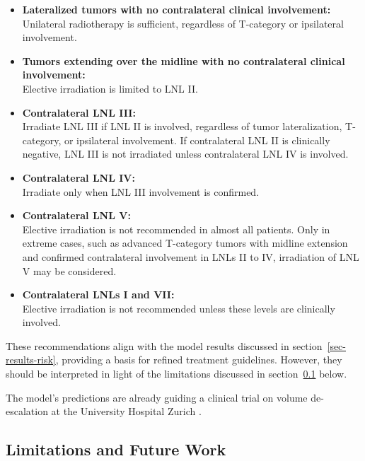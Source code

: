 \documentclass[
  sn-mathphys-num,
]{sn-jnl}
\providecommand{\tightlist}{%
  \setlength{\itemsep}{0pt}\setlength{\parskip}{0pt}}\usepackage{longtable,booktabs,array}
\begin{document}
\begin{itemize}
\tightlist
\item
  \textbf{Lateralized tumors with no contralateral clinical
  involvement:}\\
  Unilateral radiotherapy is sufficient, regardless of T-category or
  ipsilateral involvement.\\
\item
  \textbf{Tumors extending over the midline with no contralateral
  clinical involvement:}\\
  Elective irradiation is limited to LNL II.\\
\item
  \textbf{Contralateral LNL III:}\\
  Irradiate LNL III if LNL II is involved, regardless of tumor
  lateralization, T-category, or ipsilateral involvement. If
  contralateral LNL II is clinically negative, LNL III is not irradiated
  unless contralateral LNL IV is involved.\\
\item
  \textbf{Contralateral LNL IV:}\\
  Irradiate only when LNL III involvement is confirmed.\\
\item
  \textbf{Contralateral LNL V:}\\
  Elective irradiation is not recommended in almost all patients. Only
  in extreme cases, such as advanced T-category tumors with midline
  extension and confirmed contralateral involvement in LNLs II to IV,
  irradiation of LNL V may be considered.\\
\item
  \textbf{Contralateral LNLs I and VII:}\\
  Elective irradiation is not recommended unless these levels are
  clinically involved.
\end{itemize}

These recommendations align with the model results discussed in
section~\ref{sec-results-risk}, providing a basis for refined treatment
guidelines. However, they should be interpreted in light of the
limitations discussed in section~\ref{sec-discussion-limitations} below.

The model's predictions are already guiding a clinical trial on volume
de-escalation at the University Hospital Zurich
\citep{universityofzurich_personalized_2024}.

\subsection{Limitations and Future
Work}\label{sec-discussion-limitations}
\end{document}
